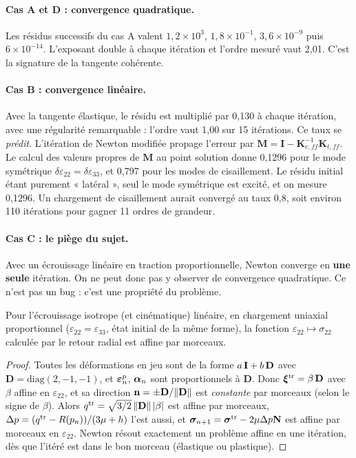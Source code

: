 \paragraph{Cas A et D : convergence quadratique.} Les résidus successifs du cas A valent $1{,}2\times10^{3}$, $1{,}8\times10^{-1}$, $3{,}6\times10^{-9}$ puis $6\times10^{-14}$. L'exposant double à chaque itération et l'ordre mesuré vaut 2,01. C'est la signature de la tangente cohérente.

\paragraph{Cas B : convergence linéaire.} Avec la tangente élastique, le résidu est multiplié par 0,130 à chaque itération, avec une régularité remarquable : l'ordre vaut 1,00 sur 15 itérations. Ce taux se \emph{prédit}. L'itération de Newton modifiée propage l'erreur par $\mathbf{M}=\mathbf{I}-\mathbf{K}_{e,ff}^{-1}\mathbf{K}_{t,ff}$. Le calcul des valeurs propres de $\mathbf{M}$ au point solution donne 0,1296 pour le mode symétrique $\delta\varepsilon_{22}=\delta\varepsilon_{33}$, et 0,797 pour les modes de cisaillement. Le résidu initial étant purement « latéral », seul le mode symétrique est excité, et on mesure 0,1296. Un chargement de cisaillement aurait convergé au taux 0,8, soit environ 110 itérations pour gagner 11 ordres de grandeur.

\paragraph{Cas C : le piège du sujet.} Avec un écrouissage linéaire en traction proportionnelle, Newton converge en \textbf{une seule} itération. On ne peut donc pas y observer de convergence quadratique. Ce n'est pas un bug : c'est une propriété du problème.

\begin{proposition}
Pour l'écrouissage isotrope (et cinématique) linéaire, en chargement uniaxial proportionnel ($\varepsilon_{22}=\varepsilon_{33}$, état initial de la même forme), la fonction $\varepsilon_{22}\mapsto\sigma_{22}$ calculée par le retour radial est affine par morceaux.
\end{proposition}
\begin{proof}
Toutes les déformations en jeu sont de la forme $a\,\mathbf{I}+b\,\mathbf{D}$ avec $\mathbf{D}=\mathrm{diag}(2,-1,-1)$, et $\boldsymbol{\varepsilon}^{p}_n$, $\boldsymbol{\alpha}_n$ sont proportionnels à $\mathbf{D}$. Donc $\boldsymbol{\xi}^{\mathrm{tr}}=\beta\,\mathbf{D}$ avec $\beta$ affine en $\varepsilon_{22}$, et sa direction $\mathbf{n}=\pm\mathbf{D}/\|\mathbf{D}\|$ est \emph{constante} par morceaux (selon le signe de $\beta$). Alors $q^{\mathrm{tr}}=\sqrt{3/2}\,\|\mathbf{D}\|\,|\beta|$ est affine par morceaux, $\Delta p=(q^{\mathrm{tr}}-R(p_n))/(3\mu+h)$ l'est aussi, et $\boldsymbol{\sigma}_{n+1}=\boldsymbol{\sigma}^{\mathrm{tr}}-2\mu\Delta p\mathbf{N}$ est affine par morceaux en $\varepsilon_{22}$. Newton résout exactement un problème affine en une itération, dès que l'itéré est dans le bon morceau (élastique ou plastique).
\end{proof}

